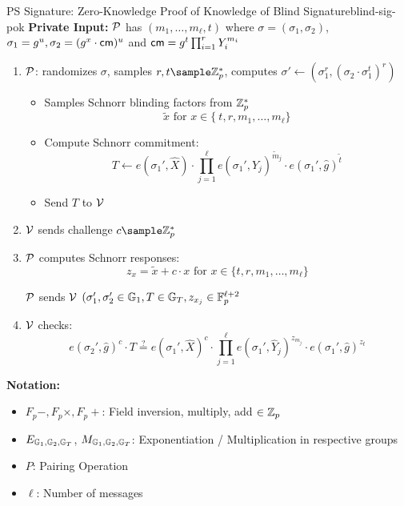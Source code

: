 {\begin{protocol}{PS Signature: Zero-Knowledge Proof of Knowledge of Blind Signature}{blind-sig-pok}
    \textbf{Private Input:} $\mathcal{P}$ has $(m_1,\ldots,m_\ell, t)$ where $\sigma = (\sigma_1, \sigma_2)$, $\sigma_1 = g^u, \sigma_2 = (g^x \cdot \mathsf{cm})^u$ and $\mathsf{cm} = g^t\prod_{i=1}^rY_i^{m_i}$
    \vspace{1em}
    \begin{enumerate}
        \item $\mathcal{P}$: randomizes $\sigma$, samples $r,t \sample \Z_p^*$, computes $\sigma' \gets (\sigma_1^r, (\sigma_2 \cdot \sigma_1^t)^r)$\
        \begin{itemize}
            \item Samples Schnorr blinding factors from $\mathbb{Z}_p^*$
            \[
            \tilde{x} \text{ for } x \in \{\ t, r, m_1, \ldots, m_{\ell}\}
            \]
            \item Compute Schnorr commitment:
            \[
            T \gets e(\sigma_1',\hat{X}) \cdot \prod_{j=1}^\ell e(\sigma_1', \widehat{Y}_j)^{\tilde{m}_j} \cdot e(\sigma_1', \hat{g})^{\tilde{t}}
            \]
            \item Send $T$ to $\mathcal{V}$
        \end{itemize}
        
        \item $\mathcal{V}$ sends challenge $c \sample \Z_p^*$
        
        \item $\mathcal{P}$ computes Schnorr responses:
        \[
        z_{x} = \tilde{x} + c \cdot x \text{ for } x \in \{t,r, m_1, \ldots, m_\ell\}
        \]

        $\mathcal{P}$ sends $\mathcal{V}$ $(\sigma_1', \sigma_2' \in \mathbb{G}_1, T \in \mathbb{G}_T, z_{x_j} \in \mathbb{F}_p^{\ell + 2} $
        
        \item $\mathcal{V}$ checks:
        \[
        e(\sigma_2', \hat{g})^c \cdot T \stackrel{?}{=} e(\sigma_1',\hat{X})^c \cdot \prod_{j=1}^\ell e(\sigma_1', \widehat{Y}_j)^{z_{m_j}} \cdot e(\sigma_1', \hat{g})^{z_t}
        \]
    \end{enumerate}
\end{protocol}

\newpage

\noindent\textbf{Notation:}
\begin{itemize}
    \item $F_p-, F_p \times, F_p +$: Field inversion, multiply, add $\in \mathbb{Z}_p$
    \item $E_{\mathbb{G}_1, \mathbb{G}_2, \mathbb{G}_T}$, $M_{\mathbb{G}_1, \mathbb{G}_2, \mathbb{G}_T}$: Exponentiation / Multiplication in respective groups
    \item $P$: Pairing Operation
    \item $\ell$: Number of messages
\end{itemize}


}
